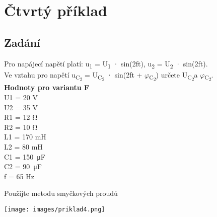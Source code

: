 \documentclass[12pt,a4paper]{article} %
\begin{document}
	\section{Čtvrtý příklad} %
		\subsection*{Zadání}
		Pro napájecí napětí platí: 
		u\textsubscript{1} =  U\textsubscript{1} · sin(2\si{\pi}ft), u\textsubscript{2} = U\textsubscript{2} · sin(2\si{\pi}ft).
		\\Ve vztahu pro napětí u\textsubscript{C\textsubscript{2}} = U\textsubscript{C\textsubscript{2}} · sin(2\si{\pi}ft + $\varphi$\textsubscript{C\textsubscript{2}}) určete \textbar U\textsubscript{C\textsubscript{2}}\textbar a $\varphi$\textsubscript{C\textsubscript{2}}. 
		\\\textbf{Hodnoty pro variantu F}
		\\U1 = 20 V 
		\\U2 = 35 V 
		\\R1 = 12 \si{\ohm} 
		\\R2 = 10 \si{\ohm}
		\\L1 = 170 mH
		\\L2 = 80 mH
		\\C1 = \SI{150}{\micro F}
		\\C2 = \SI{90}{\micro F}
		\\f = 65 Hz
		
		\medskip
		
		Použijte metodu smyčkových proudů
		
		\medskip
		
		\centerline{
		\texttt{[image: images/priklad4.png]}
		}
	    \clearpage
	    
\end{document}
